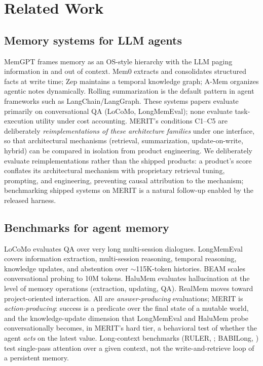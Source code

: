 \documentclass[journal]{IEEEtran}
\newcommand{\merit}{\textsc{MERIT}}
\begin{document}
\section{Related Work}

\subsection{Memory systems for LLM agents}

MemGPT \cite{memgpt} frames memory as an OS-style hierarchy with the LLM
paging information in and out of context. Mem0 \cite{mem0} extracts and
consolidates structured facts at write time; Zep \cite{zep} maintains a
temporal knowledge graph; A-Mem \cite{amem} organizes agentic notes
dynamically. Rolling summarization is the default pattern in agent frameworks
such as LangChain/LangGraph. These systems papers evaluate primarily on
conversational QA (LoCoMo, LongMemEval); none evaluate task-execution utility
under cost accounting. \merit{}'s conditions C1--C5 are deliberately
\emph{reimplementations of these architecture families} under one interface,
so that architectural mechanisms (retrieval, summarization, update-on-write,
hybrid) can be compared in isolation from product engineering. We
deliberately evaluate reimplementations rather than the shipped products:
a product's score conflates its architectural mechanism with proprietary
retrieval tuning, prompting, and engineering, preventing causal
attribution to the mechanism; benchmarking shipped systems on \merit{} is
a natural follow-up enabled by the released harness.

\subsection{Benchmarks for agent memory}

LoCoMo \cite{locomo} evaluates QA over very long multi-session dialogues.
LongMemEval \cite{longmemeval} covers information extraction, multi-session
reasoning, temporal reasoning, knowledge updates, and abstention over
${\sim}$115K-token histories. BEAM \cite{beam} scales conversational probing
to 10M tokens. HaluMem \cite{halumem} evaluates hallucination at the level
of memory operations (extraction, updating, QA). RealMem \cite{realmem}
moves toward project-oriented interaction. All are \emph{answer-producing}
evaluations; \merit{} is \emph{action-producing}: success is a predicate over
the final state of a mutable world, and the knowledge-update dimension that
LongMemEval and HaluMem probe conversationally becomes, in \merit{}'s hard
tier, a behavioral test of whether the agent \emph{acts} on the latest value.
Long-context benchmarks (RULER, \cite{ruler}; BABILong, \cite{babilong})
test single-pass attention over a given context, not the write-and-retrieve
loop of a persistent memory.
\end{document}

